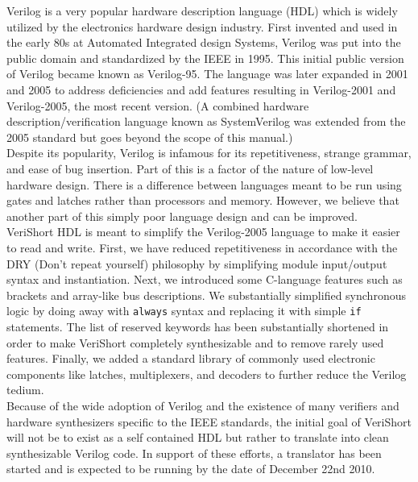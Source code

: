 \documentclass[letterpaper,11pt]{article}
\begin{document}
    \indent\indent Verilog is a very popular hardware description language (HDL) which is widely utilized by
    the electronics hardware design industry. First invented and used in the early 80s at
    Automated Integrated design Systems, Verilog was put into the public domain and
    standardized by the IEEE in 1995. This initial public version of Verilog became known as 
    Verilog-95. The language was later expanded in 2001 and 2005 to address deficiencies
    and add features resulting in Verilog-2001 and Verilog-2005, the most recent version. (A
    combined hardware description\slash verification language known as SystemVerilog was 
    extended from the 2005 standard but goes beyond the scope of this manual.) \\
    \indent Despite its popularity, Verilog is infamous for its repetitiveness, strange grammar, and 
    ease of bug insertion. Part of this is a factor of the nature of low-level hardware design. 
    There is a difference between languages meant to be run using gates and latches rather 
    than processors and memory. However, we believe that another part of this simply poor 
    language design and can be improved. \\
    \indent VeriShort HDL is meant to simplify the Verilog-2005 language to make it easier to read 
    and write. First, we have reduced repetitiveness in accordance with the DRY (Don't 
    repeat yourself) philosophy by simplifying module input/output syntax and instantiation. 
    Next, we introduced some C-language features such as brackets and array-like bus
    descriptions. We substantially simplified synchronous logic by doing away with \texttt{always} 
    syntax and replacing it with simple \texttt{if} statements. The list of reserved keywords has been 
    substantially shortened in order to make VeriShort completely synthesizable and to 
    remove rarely used features. Finally, we added a standard library of commonly used 
    electronic components like latches, multiplexers, and decoders to further reduce the 
    Verilog tedium. \\
    \indent Because of the wide adoption of Verilog and the existence of many verifiers and 
    hardware synthesizers specific to the IEEE standards, the initial goal of VeriShort will not 
    be to exist as a self contained HDL but rather to translate into clean synthesizable Verilog 
    code. In support of these efforts, a translator has been started and is expected to be 
    running by the date of December 22nd 2010.
\end{document}
